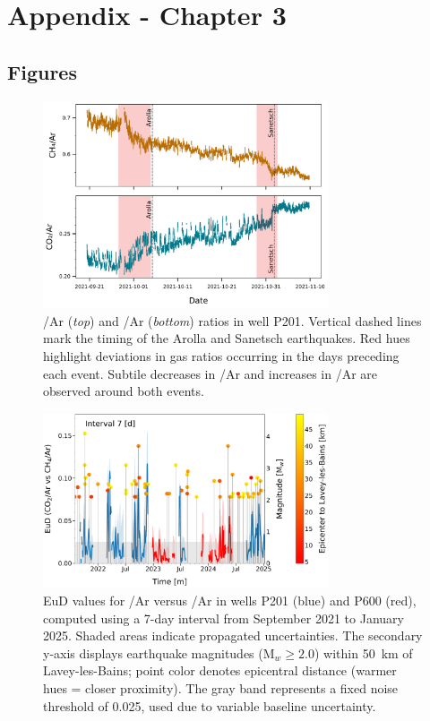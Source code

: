 \chapter{Appendix - Chapter 3}
\label{ch:appendix_ch3}

\section{Figures}

\begin{figure}[H]
    \centering
    \includegraphics[width=0.75\textwidth]{chapters/06_appendix/SI_C3/article_ratios_SanAr.pdf}
    \caption{
    /Ar (\textit{top}) and /Ar (\textit{bottom}) ratios in well P201.
    Vertical dashed lines mark the timing of the Arolla and Sanetsch earthquakes.
    Red hues highlight deviations in gas ratios occurring in the days preceding each event.
    Subtile decreases in /Ar and increases in /Ar are observed around both events.
    }
    \label{figSI:ratios_SanAr}
\end{figure}

\begin{figure}[H]
    \centering
    \includegraphics[width=0.75\textwidth]{chapters/06_appendix/SI_C3/full_EuD_7.pdf}
    \caption{
    EuD values for /Ar versus /Ar in wells P201 (blue) and P600 (red), computed using a 7-day interval from September 2021 to January 2025.
    Shaded areas indicate propagated uncertainties.
    The secondary y-axis displays earthquake magnitudes (M$_w \geq 2.0$) within \SI{50}{\kilo\meter} of Lavey-les-Bains; point color denotes epicentral distance (warmer hues = closer proximity).
    The gray band represents a fixed noise threshold of 0.025, used due to variable baseline uncertainty.
    }
    \label{figSI:full_EuD_EuD7}
\end{figure}

